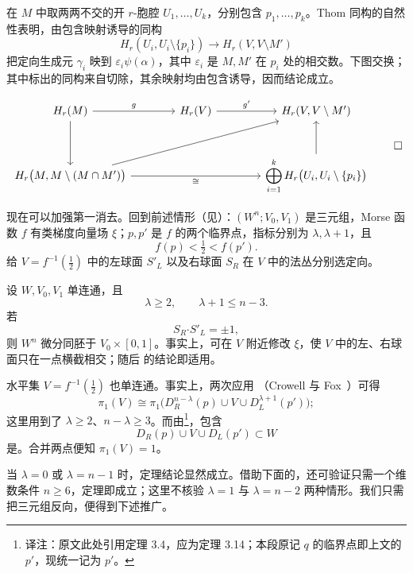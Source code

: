 \Proof 在 $M$ 中取两两不交的开 $r$-胞腔 $U_1,\ldots,U_k$，分别包含 $p_1,\ldots,p_k$。Thom 同构的自然性表明，由包含映射诱导的同构
\[
  H_r(U_i,U_i\setminus\{p_i\})
  \longrightarrow H_r(V,V\setminus M')
\]
把定向生成元 $\gamma_i$ 映到 $\varepsilon_i\psi(\alpha)$，其中 $\varepsilon_i$ 是 $M,M'$ 在 $p_i$ 处的相交数。下图交换；其中标出的同构来自切除，其余映射均由包含诱导，因而结论成立。
\begin{MilnorProofEnd}
\[
\begin{tikzcd}[column sep=4.0em,row sep=3.0em]
  H_r(M) \arrow[r,"g"] \arrow[d]
    & H_r(V) \arrow[r,"g'"]
    & H_r(V,V\setminus M') \\
  H_r\bigl(M,M\setminus(M\cap M')\bigr)
    \arrow[rr,"\cong"'] \arrow[urr]
    && \displaystyle\bigoplus_{i=1}^k
       H_r\bigl(U_i,U_i\setminus\{p_i\}\bigr) \arrow[u]
\end{tikzcd}
\qedhere
\]
\end{MilnorProofEnd}



现在可以加强第一消去。回到前述情形（见）：$(W^n;V_0,V_1)$ 是三元组，Morse 函数 $f$ 有类梯度向量场 $\xi$；$p,p'$ 是 $f$ 的两个临界点，指标分别为 $\lambda,\lambda+1$，且
\[
  f(p)<\tfrac12<f(p').
\]
给 $V=f^{-1}(\tfrac12)$ 中的左球面 $S'_L$ 以及右球面 $S_R$ 在 $V$ 中的法丛分别选定向。

设 $W,V_0,V_1$ 单连通，且
\[
  \lambda\geq2,
  \qquad
  \lambda+1\leq n-3.
\]
若
\[
  S_R\mathbin{\boldsymbol\cdot}S'_L=\pm1,
\]
则 $W^n$ 微分同胚于 $V_0\times[0,1]$。事实上，可在 $V$ 附近修改 $\xi$，使 $V$ 中的左、右球面只在一点横截相交；随后 的结论即适用。

\label{rem:6-4-1}水平集 $V=f^{-1}(\tfrac12)$ 也单连通。事实上，两次应用 （Crowell 与 Fox~\cite[p.~63]{ref17}）可得
\[
  \pi_1(V)\cong
  \pi_1\bigl(D_R^{n-\lambda}(p)\cup V\cup D_L^{\lambda+1}(p')\bigr);
\]
这里用到了 $\lambda\geq2$、$n-\lambda\geq3$。而由\footnote{译注：原文此处引用定理 3.4，应为定理 3.14；本段原记 $q$ 的临界点即上文的 $p'$，现统一记为 $p'$。}，包含
\[
  D_R(p)\cup V\cup D_L(p')\subset W
\]
是。合并两点便知 $\pi_1(V)=1$。

\label{rem:6-4-2}当 $\lambda=0$ 或 $\lambda=n-1$ 时，定理结论显然成立。借助下面的，还可验证只需一个维数条件 $n\geq6$，定理即成立；这里不核验 $\lambda=1$ 与 $\lambda=n-2$ 两种情形。我们只需把三元组反向，便得到下述推广。

